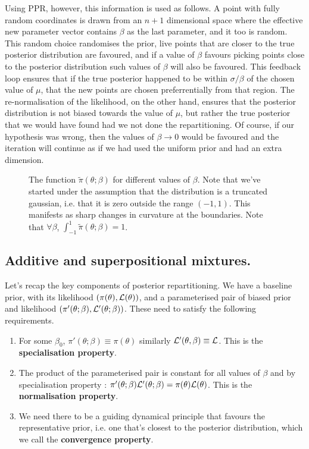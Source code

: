 \documentclass[usenatbib]{mnras}
\begin{document}
Using PPR, however, this information is used as follows. A point
with fully random coordinates is drawn from an \(n+1\) dimensional
space where the effective new parameter vector contains \(\beta\)
as the last parameter, and it too is random. This random choice
randomises the prior, live points that are closer to the true
posterior distribution are favoured, and if a value of \(\beta\)
favours picking points close to the posterior distribution such
values of \(\beta\) will also be favoured. This feedback loop
ensures that if the true posterior happened to be within \(\sigma /
   \beta\) of the chosen value of \(\mu\), that the new points are
chosen preferrentially from that region. The re-normalisation of
the likelihood, on the other hand, ensures that the posterior
distribution is not biased towards the value of \(\mu\), but rather
the true posterior that we would have found had we not done the
repartitioning. Of course, if our hypothesis was wrong, then the
values of \(\beta \rightarrow 0\) would be favoured and the
iteration will continue as if we had used the uniform prior and had
an extra dimension.

\begin{figure}
 
\caption{\label{org8a74bfc}
The function \(\tilde{\pi}(\theta; \beta)\) for different values of \(\beta\). Note that we've started under the assumption that the distribution is a truncated gaussian, i.e. that it is zero outside the range \((-1, 1)\). This manifests as sharp changes in curvature at the boundaries. Note that \(\forall \beta\), \(\int_{-1}^{1}\tilde{\pi}(\theta; \beta) = 1\).}
\end{figure}

\subsection{Additive and superpositional mixtures.}
\label{sec:org08af3c6}

Let's recap the key components of posterior repartitioning. We have
   a baseline prior, with its likelihood \((\pi(\theta), \cal L
      (\theta))\), and a parameterised pair of biased prior and
   likelihood \((\pi'(\theta; \beta), \cal L' (\theta;
      \beta))\). These need to satisfy the following requirements.

\begin{enumerate}
\item For some \(\beta_{0}\), \(\pi'(\theta; \beta) \equiv \pi(\theta)\)
similarly \({\cal L'(\theta, \beta) \equiv {\cal L}}\). This is
the \textbf{\textbf{specialisation property}}.\label{spec-prop}
\item The product of the parameterised pair is constant for all values
of \(\beta\) and by specialisation property : \(\pi'(\theta; \beta)
      \cal L' (\theta; \beta) = \pi(\theta) \cal L (\theta)\). This is
the \textbf{\textbf{normalisation property}}.\label{norm-prop}
\item We need there to be a guiding dynamical principle that favours
the representative prior, i.e. one that's closest to the
posterior distribution, which we call the \textbf{\textbf{convergence
property}}.\label{conv-prop}
\end{enumerate}
\end{document}
